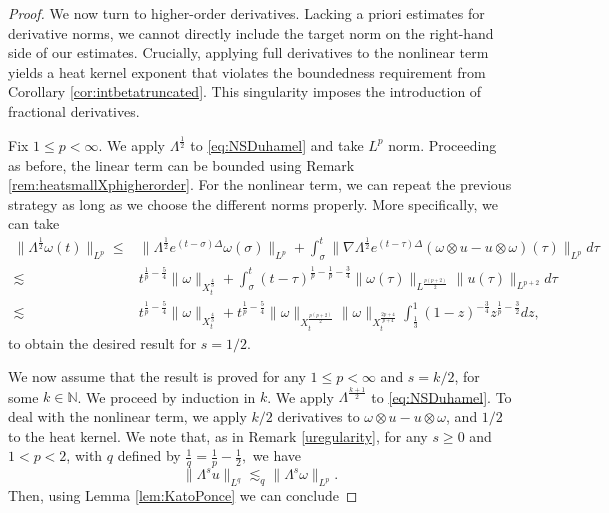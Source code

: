 \documentclass[11pt,a4paper]{article}
\newcommand{\w}{\omega}
\newcommand{\na}{\nabla}
\newcommand{\N}{\mathbb{N}}
\def\heat#1{e^{#1 \Delta}}
\begin{document}
\begin{proof}
We now turn to higher-order derivatives. Lacking a priori estimates for derivative norms, we cannot directly include the target norm on the right-hand side of our estimates. Crucially, applying full derivatives to the nonlinear term yields a heat kernel exponent that violates the boundedness requirement from Corollary \ref{cor:intbetatruncated}. This singularity imposes the introduction of fractional derivatives.

Fix $1\leq p<\infty.$ We apply $\Lambda^\frac{1}{2}$ to \eqref{eq:NSDuhamel} and take $L^p$ norm. Proceeding as before, the linear term can be bounded using Remark \ref{rem:heatsmallXphigherorder}. For the nonlinear term, we can repeat the previous strategy as long as we choose the different norms properly. More specifically, we can take
$$
\begin{aligned}
\|\Lambda^\frac{1}{2}\w(t)\|_{L^p}\leq& \|\Lambda^\frac{1}{2}\heat{(t-\sigma)}\w(\sigma)\|_{L^p}+\int_\sigma^t\|\na\Lambda^{\frac{1}{2}}\heat{(t-\tau)}(\w\otimes u-u\otimes \w)(\tau)\|_{L^p}d\tau\\
\lesssim & t^{\frac{1}{p}-\frac{5}{4}}\|\omega\|_{X_t^{\frac{4}{3}}}+\int_\sigma^t (t-\tau)^{\frac{1}{p}-\frac{1}{p}-\frac{3}{4}}\|\w(\tau)\|_{L^{\frac{p(p+2)}{2}}}\|u(\tau)\|_{L^{p+2}}d\tau\\
\lesssim & t^{\frac{1}{p}-\frac{5}{4}}\|\omega\|_{X_t^{\frac{4}{3}}}+ t^{\frac{1}{p}-\frac{5}{4}}\|\omega\|_{X_t^{\frac{p(p+2)}{2}}}\|\omega\|_{X_t^{\frac{2p+4}{p+4}}}\int_{\frac{1}{3}}^1 (1-z)^{-\frac{3}{4}}z^{\frac{1}{p}-\frac{3}{2}}dz,
\end{aligned}$$
to obtain the desired result for $s=1/2$.

We now assume that the result is proved for any $1\leq p<\infty$ and $s=k/2$, for some $k\in \N$. We proceed by induction in $k$.  We apply $\Lambda^{\frac{k+1}{2}}$ to \eqref{eq:NSDuhamel}. To deal with the nonlinear term, we apply $k/2$ derivatives to $\omega\otimes u-u\otimes \w$, and $1/2$ to the heat kernel. We note that, as in Remark \ref{uregularity}, for any $s\geq 0$ and $1<p<2$, with $q$ defined by
$
\frac{1}{q}=\frac{1}{p}-\frac{1}{2},
$
we have
\begin{equation}\label{eq:bounduwgeneral}
\|\Lambda^s u\|_{L^q}\lesssim_q\|\Lambda^s\w\|_{L^p}.
\end{equation} Then, using Lemma \ref{lem:KatoPonce} we can conclude 


\end{proof}
\end{document}

